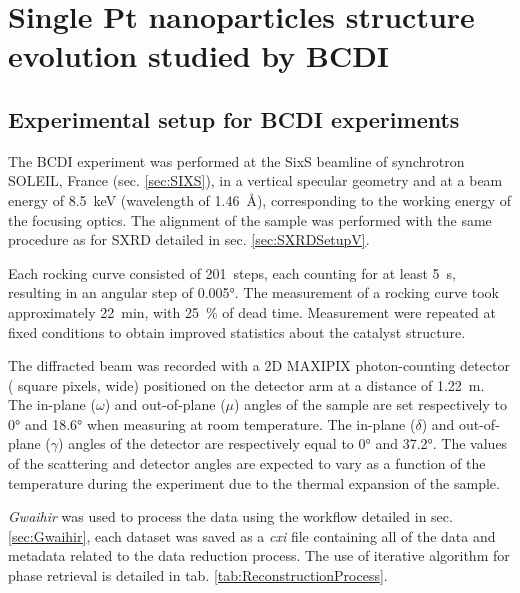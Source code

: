 \section{Single Pt nanoparticles structure evolution studied by BCDI}\label{sec:BCDINanoparticles}


\subsection{Experimental setup for BCDI experiments}\label{sec:BCDISetup}

The BCDI experiment was performed at the SixS beamline of synchrotron SOLEIL, France (sec. \ref{sec:SIXS}), in a vertical specular geometry and at a beam energy of \qty{8.5}{\keV} (wavelength of \qty{1.46}{\angstrom}), corresponding to the working energy of the focusing optics.
The alignment of the sample was performed with the same procedure as for SXRD detailed in sec. \ref{sec:SXRDSetupV}.

Each rocking curve consisted of \qty{201}{steps}, each counting for at least \qty{5}{\second}, resulting in an angular step of \ang{0.005}.
The measurement of a rocking curve took approximately \qty{22}{\minute}, with \qty{25}{\percent} of dead time.
Measurement were repeated at fixed conditions to obtain improved statistics about the catalyst structure.

The diffracted beam was recorded with a 2D MAXIPIX photon-counting detector ( square pixels,  wide) positioned on the detector arm at a distance of \qty{1.22}{\meter}.
The in-plane ($\omega$) and out-of-plane ($\mu$) angles of the sample are set respectively to \ang{0} and \ang{18.6} when measuring at room temperature.
The in-plane ($\delta$) and out-of-plane ($\gamma$) angles of the detector are respectively equal to \ang{0} and \ang{37.2}.
The values of the scattering and detector angles are expected to vary as a function of the temperature during the experiment due to the thermal expansion of the sample.

\textit{Gwaihir} was used to process the data using the workflow detailed in sec. \ref{sec:Gwaihir}, each dataset was saved as a \textit{cxi} file containing all of the data and metadata related to the data reduction process.
The use of iterative algorithm for phase retrieval is detailed in tab. \ref{tab:ReconstructionProcess}.

